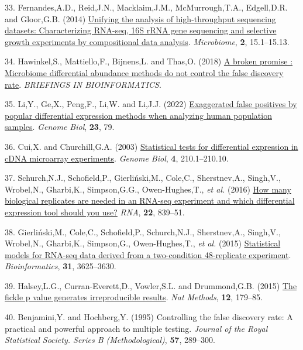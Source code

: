 \documentclass[
]{article}
\newlength{\cslhangindent}
\newenvironment{CSLReferences}[2] %
 {\begin{list}{}{%
  \setlength{\itemindent}{0pt}
  \setlength{\leftmargin}{0pt}
  \setlength{\parsep}{0pt}
  \ifodd #1
   \setlength{\leftmargin}{\cslhangindent}
   \setlength{\itemindent}{-1\cslhangindent}
  \fi
  \setlength{\itemsep}{#2\baselineskip}}}
 {\end{list}}
\begin{document}
\begin{CSLReferences}{1}{1}
33. Fernandes,A.D., Reid,J.N., Macklaim,J.M., McMurrough,T.A.,
Edgell,D.R. and Gloor,G.B. (2014)
\href{https://doi.org/10.1186/2049-2618-2-15}{Unifying the analysis of
high-throughput sequencing datasets: Characterizing {RNA}-seq, 16{S}
r{RNA} gene sequencing and selective growth experiments by compositional
data analysis}. \emph{Microbiome}, \textbf{2}, 15.1--15.13.

34. Hawinkel,S., Mattiello,F., Bijnens,L. and Thas,O. (2018)
\href{http://dx.doi.org/10.1093/bib/bbx104}{A broken promise :
Microbiome differential abundance methods do not control the false
discovery rate}. \emph{BRIEFINGS IN BIOINFORMATICS}.

35. Li,Y., Ge,X., Peng,F., Li,W. and Li,J.J. (2022)
\href{https://doi.org/10.1186/s13059-022-02648-4}{Exaggerated false
positives by popular differential expression methods when analyzing
human population samples}. \emph{Genome Biol}, \textbf{23}, 79.

36. Cui,X. and Churchill,G.A. (2003)
\href{https://www.ncbi.nlm.nih.gov/pubmed/12702200}{Statistical tests
for differential expression in cDNA microarray experiments}.
\emph{Genome Biol}, \textbf{4}, 210.1--210.10.

37. Schurch,N.J., Schofield,P., Gierliński,M., Cole,C., Sherstnev,A.,
Singh,V., Wrobel,N., Gharbi,K., Simpson,G.G., Owen-Hughes,T., \emph{et
al.} (2016) \href{https://doi.org/10.1261/rna.053959.115}{How many
biological replicates are needed in an RNA-seq experiment and which
differential expression tool should you use?} \emph{RNA}, \textbf{22},
839--51.

38. Gierliński,M., Cole,C., Schofield,P., Schurch,N.J., Sherstnev,A.,
Singh,V., Wrobel,N., Gharbi,K., Simpson,G., Owen-Hughes,T., \emph{et
al.} (2015)
\href{https://doi.org/10.1093/bioinformatics/btv425}{Statistical models
for RNA-seq data derived from a two-condition 48-replicate experiment}.
\emph{Bioinformatics}, \textbf{31}, 3625--3630.

39. Halsey,L.G., Curran-Everett,D., Vowler,S.L. and Drummond,G.B. (2015)
\href{https://doi.org/10.1038/nmeth.3288}{The fickle p value generates
irreproducible results}. \emph{Nat Methods}, \textbf{12}, 179--85.

40. Benjamini,Y. and Hochberg,Y. (1995) Controlling the false discovery
rate: A practical and powerful approach to multiple testing.
\emph{Journal of the Royal Statistical Society. Series B
(Methodological)}, \textbf{57}, 289--300.


\end{CSLReferences}
\end{document}
